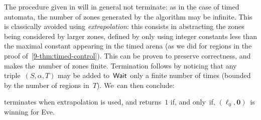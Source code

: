 
The procedure given in  will in general not
terminate: as in the case of timed automata, the number of zones
generated by the algorithm may be infinite. This is classically
avoided using \emph{extrapolation}: this consists in abstracting the
zones being considered by larger zones, defined by only using integer
constants less than the maximal constant appearing in the timed arena
(as we did for regions in the proof
of~\cref{9-thm:timed-control}). This can be proven to preserve
correctness, and makes the~number of zones finite. Termination follows
by noticing that any triple~$(S,\alpha,T)$ may be added to~$\textsf{Wait}$ only
a finite number of times (bounded by the number of regions
in~$T$). 
%
We~can then conclude:
\begin{theorem}
 terminates when extrapolation is used, and returns~$1$ if, and only~if,
$(\ell_0,\mathbf{0})$~is winning for Eve.
\end{theorem}
